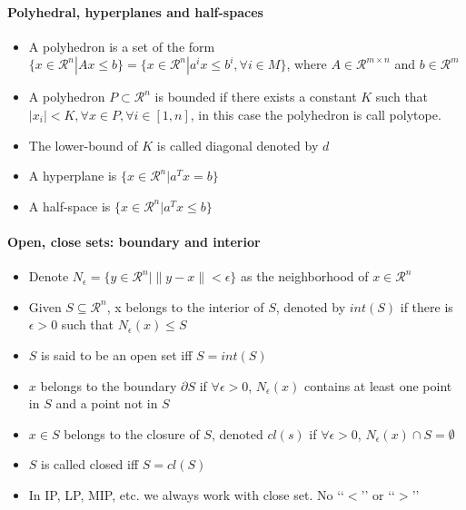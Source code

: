             \paragraph{Polyhedral, hyperplanes and half-spaces}
                \begin{itemize}
                    \item A polyhedron is a set of the form $\{x\in \mathcal{R}^n|Ax\le b\}=\{x \in \mathcal{R}^n | a^ix\le b^i, \forall i \in M\}$, where $A \in \mathcal{R}^{m\times n}$ and $b \in \mathcal{R}^m$
                    \item A polyhedron $P \subset \mathcal{R}^n$ is bounded if there exists a constant $K$ such that $|x_i|<K, \forall x \in P, \forall i \in [1, n]$, in this case the polyhedron is call polytope.
                    \item The lower-bound of $K$ is called diagonal denoted by $d$
                    \item A hyperplane is $\{x\in \mathcal{R}^n|a^Tx=b\}$
                    \item A half-space is $\{x\in \mathcal{R}^n|a^Tx\le b\}$
                \end{itemize}

            \paragraph{Open, close sets: boundary and interior}
                \begin{itemize}
                    \item Denote $N_\epsilon = \{y\in \mathcal{R}^n|\lVert y-x\rVert < \epsilon \}$ as the neighborhood of $x\in \mathcal{R}^n$
                    \item Given $S\subseteq \mathcal{R}^n$, x belongs to the interior of $S$, denoted by $int(S)$ if there is $\epsilon > 0$ such that $N_\epsilon(x) \le S$
                    \item $S$ is said to be an open set iff $S=int(S)$
                    \item $x$ belongs to the boundary $\partial S$ if $\forall \epsilon >0$, $N_\epsilon(x)$ contains at least one point in $S$ and a point not in $S$
                    \item $x\in S$ belongs to the closure of $S$, denoted $cl(s)$ if $\forall \epsilon > 0$, $N_\epsilon(x) \cap S = \emptyset$
                    \item $S$ is called closed iff $S=cl(S)$
                    \item In IP, LP, MIP, etc. we always work with close set. No \lq\lq{}$<$\rq\rq{} or \lq\lq{}$>$\rq\rq{}
                \end{itemize}

